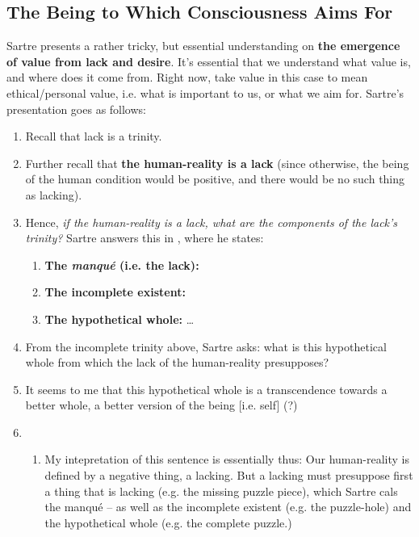 \subsection*{The Being to Which Consciousness Aims For}
Sartre presents a rather tricky, but essential understanding on \textbf{the emergence of value from lack and desire}. It's essential that we understand what value is, and where does it come from. Right now, take value in this case to mean ethical/personal value, i.e. what is important to us, or what we aim for. Sartre's presentation goes as follows:
\begin{enumerate}
  \item Recall that lack is a trinity.
  \item Further recall that \textbf{the human-reality is a lack} (since otherwise, the being of the human condition would be positive, and there would be no such thing as lacking).
  \item Hence, \emph{if the human-reality is a lack, what are the components of the lack's trinity?} Sartre answers this in \autocite[140]{sartre}, where he states:
  \begin{enumerate}
    \item \textbf{The \emph{manqué} (i.e. the lack):} 
    \item \textbf{The incomplete existent:} 
    \item \textbf{The hypothetical whole:} \ldots
  \end{enumerate}
  \item From the incomplete trinity above, Sartre asks: what is this hypothetical whole from which the lack of the human-reality presupposes?
  \item It seems to me that this hypothetical whole is a transcendence towards a better whole, a better version of the being [i.e. self] (?)
  \item {}
  \begin{enumerate}
    \item My intepretation of this sentence is essentially thus: Our human-reality is defined by a negative thing, a lacking. But a lacking must presuppose first a thing that is lacking (e.g. the missing puzzle piece), which Sartre cals the manqué -- as well as the incomplete existent (e.g. the puzzle-hole) and the hypothetical whole (e.g. the complete puzzle.)

\end{enumerate}
\end{enumerate}
